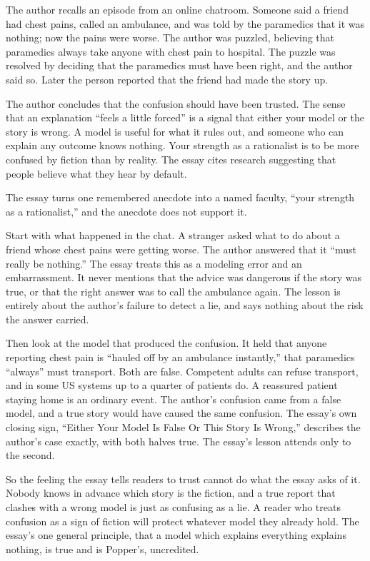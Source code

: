\begin{afterword}
\summaryhead

The author recalls an episode from an online chatroom. Someone said a friend had chest pains, called an ambulance, and was told by the paramedics that it was nothing; now the pains were worse. The author was puzzled, believing that paramedics always take anyone with chest pain to hospital. The puzzle was resolved by deciding that the paramedics must have been right, and the author said so. Later the person reported that the friend had made the story up.

The author concludes that the confusion should have been trusted. The sense that an explanation ``feels a little forced'' is a signal that either your model or the story is wrong. A model is useful for what it rules out, and someone who can explain any outcome knows nothing. Your strength as a rationalist is to be more confused by fiction than by reality. The essay cites research suggesting that people believe what they hear by default.

\responsehead

The essay turns one remembered anecdote into a named faculty, ``your strength as a rationalist,'' and the anecdote does not support it.

Start with what happened in the chat. A stranger asked what to do about a friend whose chest pains were getting worse. The author answered that it ``must really be nothing.'' The essay treats this as a modeling error and an embarrassment. It never mentions that the advice was dangerous if the story was true, or that the right answer was to call the ambulance again. The lesson is entirely about the author's failure to detect a lie, and says nothing about the risk the answer carried.

Then look at the model that produced the confusion. It held that anyone reporting chest pain is ``hauled off by an ambulance instantly,'' that paramedics ``always'' must transport. Both are false. Competent adults can refuse transport, and in some US systems up to a quarter of patients do. A reassured patient staying home is an ordinary event. The author's confusion came from a false model, and a true story would have caused the same confusion. The essay's own closing sign, ``Either Your Model Is False Or This Story Is Wrong,'' describes the author's case exactly, with both halves true. The essay's lesson attends only to the second.

So the feeling the essay tells readers to trust cannot do what the essay asks of it. Nobody knows in advance which story is the fiction, and a true report that clashes with a wrong model is just as confusing as a lie. A reader who treats confusion as a sign of fiction will protect whatever model they already hold. The essay's one general principle, that a model which explains everything explains nothing, is true and is Popper's, uncredited.


\end{afterword}

